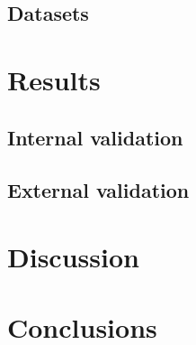 \documentclass[12pt]{scrartcl}
\begin{document}
\subsection{Datasets}

\section{Results}

\subsection{Internal validation}

\subsection{External validation}

\section{Discussion}

\section{Conclusions}
\end{document}
